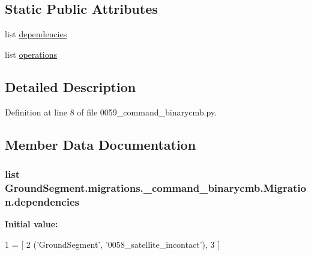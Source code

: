 \subsection*{Static Public Attributes}
\begin{DoxyCompactItemize}
\item 
list \hyperlink{class_ground_segment_1_1migrations_1_10059__command__binarycmb_1_1_migration_a2702bb3beab7dad68c8187a55972c5cb}{dependencies}
\item 
list \hyperlink{class_ground_segment_1_1migrations_1_10059__command__binarycmb_1_1_migration_ada6a083ce0ab32eb7261ba0ef484890b}{operations}
\end{DoxyCompactItemize}


\subsection{Detailed Description}


Definition at line 8 of file 0059\+\_\+command\+\_\+binarycmb.\+py.



\subsection{Member Data Documentation}
\hypertarget{class_ground_segment_1_1migrations_1_10059__command__binarycmb_1_1_migration_a2702bb3beab7dad68c8187a55972c5cb}{}
\subsubsection[{dependencies}]{\setlength{\rightskip}{0pt plus 5cm}list Ground\+Segment.\+migrations.\+\_\+command\+\_\+binarycmb.\+Migration.\+dependencies\hspace{0.3cm}{\ttfamily [static]}}\label{class_ground_segment_1_1migrations_1_10059__command__binarycmb_1_1_migration_a2702bb3beab7dad68c8187a55972c5cb}
{\bfseries Initial value\+:}
\begin{DoxyCode}
1 = [
2         (\textcolor{stringliteral}{'GroundSegment'}, \textcolor{stringliteral}{'0058\_satellite\_incontact'}),
3     ]
\end{DoxyCode}


